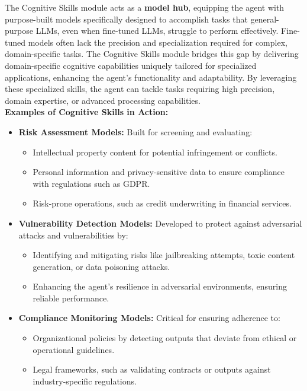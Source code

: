 \documentclass[12pt]{article}
\begin{document}
The Cognitive Skills module acts as a \textbf{model hub}, equipping the agent with purpose-built models specifically designed to accomplish tasks that general-purpose LLMs, even when fine-tuned LLMs, struggle to perform effectively. Fine-tuned models often lack the precision and specialization required for complex, domain-specific tasks. The Cognitive Skills module bridges this gap by delivering domain-specific cognitive capabilities uniquely tailored for specialized applications, enhancing the agent’s functionality and adaptability. By leveraging these specialized skills, the agent can tackle tasks requiring high precision, domain expertise, or advanced processing capabilities.
\\

\textbf{Examples of Cognitive Skills in Action:}

\begin{itemize}
    \item \textbf{Risk Assessment Models:}  
    Built for screening and evaluating:
    \begin{itemize}
        \item Intellectual property content for potential infringement or conflicts.
        \item Personal information and privacy-sensitive data to ensure compliance with regulations such as GDPR.
        \item Risk-prone operations, such as credit underwriting in financial services.
    \end{itemize}

    \item \textbf{Vulnerability Detection Models:}  
    Developed to protect against adversarial attacks and vulnerabilities by:
    \begin{itemize}
        \item Identifying and mitigating risks like jailbreaking attempts, toxic content generation, or data poisoning attacks.
        \item Enhancing the agent's resilience in adversarial environments, ensuring reliable performance.
    \end{itemize}
\newpage
    \item \textbf{Compliance Monitoring Models:}  
    Critical for ensuring adherence to:
    \begin{itemize}
        \item Organizational policies by detecting outputs that deviate from ethical or operational guidelines.
        \item Legal frameworks, such as validating contracts or outputs against industry-specific regulations.
    \end{itemize}


\end{itemize}
\end{document}
